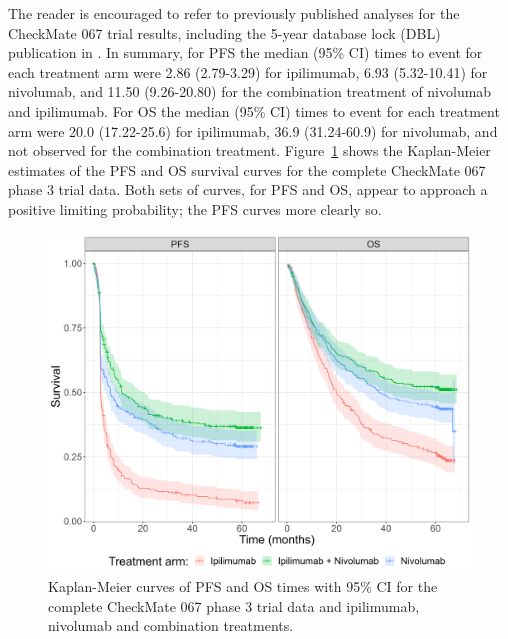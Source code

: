 \documentclass[AMA,STIX1COL]{WileyNJD-v2}
\begin{document}
The reader is encouraged to refer to previously published analyses for the CheckMate 067 trial results, including the 5-year database lock (DBL) publication in \cite{Larkin2019}. In summary, for PFS the median (95\% CI) times to event for each treatment arm were 2.86 (2.79-3.29) for ipilimumab, 6.93 (5.32-10.41) for nivolumab, and 11.50 (9.26-20.80) for the combination treatment of nivolumab and ipilimumab. For OS the median (95\% CI) times to event for each treatment arm were 20.0 (17.22-25.6) for ipilimumab, 36.9 (31.24-60.9) for nivolumab, and not observed for the combination treatment.
Figure~\ref{fig:S_raw_data} shows the Kaplan-Meier estimates of the PFS and OS survival curves for the complete CheckMate 067 phase 3 trial data.
Both sets of curves, for PFS and OS, appear to approach a positive limiting probability; the PFS curves more clearly so.


\begin{figure}[!ht]
\centering
\includegraphics[width=0.6\linewidth]{km_raw_data.png}
\caption{\label{fig:S_raw_data} Kaplan-Meier curves of PFS and OS times with 95\% CI for the complete CheckMate 067 phase 3 trial data and ipilimumab, nivolumab and combination treatments.}
\end{figure}
\end{document}
